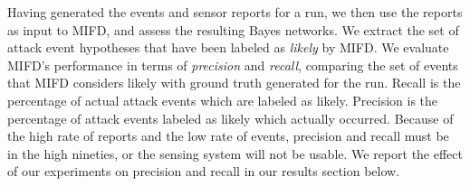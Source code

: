Having generated the events and sensor reports for a run, we then use
the reports as
input to MIFD, and assess the resulting Bayes networks.  We extract
the set of attack event hypotheses that have been labeled as
\emph{likely} by MIFD.
We evaluate MIFD's performance in terms of \emph{precision} and \emph{recall},
comparing the set of events that MIFD considers likely with ground
truth generated for the run.
Recall is the percentage of actual attack events
which are labeled as likely. 
%
Precision is the percentage of attack events labeled as likely which 
actually occurred.
Because of the high rate of reports and the low rate of events, precision and
recall must be in the high nineties, or the sensing system will not be usable.
We report the effect of our experiments on precision and recall in our
results section below.

